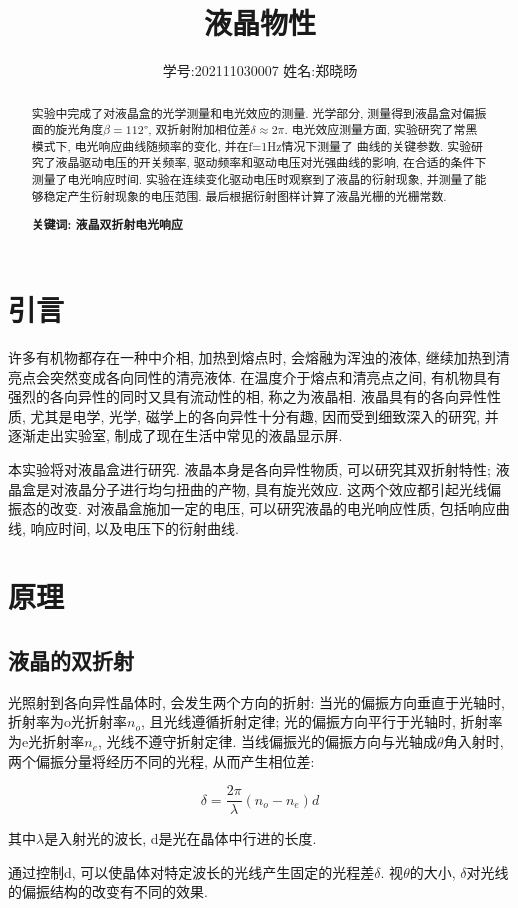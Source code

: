 \documentclass[12pt,a4paper]{article}
\title{\vspace{-4cm}\Large 液晶物性}  %
\author{\kaishu 学号:202111030007 \hspace{2cm} 姓名:郑晓旸}   %
\date{}
\newcommand{\be}[1]{
    \begin{equation}
        #1
    \end{equation}
}
\begin{document}
\maketitle

\begin{abstract}
    实验中完成了对液晶盒的光学测量和电光效应的测量. 光学部分, 测量得到液晶盒对偏振面的旋光角度$\beta=112°$, 双折射附加相位差$\delta \approx 2\pi$. 电光效应测量方面, 实验研究了常黑模式下, 电光响应曲线随频率的变化, 并在f=1Hz情况下测量了
曲线的关键参数. 实验研究了液晶驱动电压的开关频率, 驱动频率和驱动电压对光强曲线的影响, 在合适的条件下测量了电光响应时间. 实验在连续变化驱动电压时观察到了液晶的衍射现象, 并测量了能够稳定产生衍射现象的电压范围. 最后根据衍射图样计算了液晶光栅的光栅常数. 

\textbf{关键词: 液晶\quad 双折射\quad 电光响应}
\end{abstract}

\section{引言}
许多有机物都存在一种中介相, 加热到熔点时, 会熔融为浑浊的液体, 继续加热到清亮点会突然变成各向同性的清亮液体. 
在温度介于熔点和清亮点之间, 有机物具有强烈的各向异性的同时又具有流动性的相, 称之为液晶相. 液晶具有的各向异性性质, 尤其是电学, 光学, 磁学上的各向异性十分有趣, 因而受到细致深入的研究, 并逐渐走出实验室, 制成了现在生活中常见的液晶显示屏. 

本实验将对液晶盒进行研究. 液晶本身是各向异性物质, 可以研究其双折射特性; 液晶盒是对液晶分子进行均匀扭曲的产物, 具有旋光效应. 这两个效应都引起光线偏振态的改变. 
对液晶盒施加一定的电压, 可以研究液晶的电光响应性质, 包括响应曲线, 响应时间, 以及电压下的衍射曲线.
\section{原理}
\subsection{液晶的双折射}
光照射到各向异性晶体时, 会发生两个方向的折射: 当光的偏振方向垂直于光轴时, 折射率为o光折射率$n_{o}$, 且光线遵循折射定律; 光的偏振方向平行于光轴时, 折射率为e光折射率$n_{e}$, 光线不遵守折射定律. 当线偏振光的偏振方向与光轴成$\theta$角入射时, 两个偏振分量将经历不同的光程, 从而产生相位差: 
\be{\delta=\frac{2\pi}{\lambda}(n_{o}-n_{e})d}
其中$\lambda$是入射光的波长, d是光在晶体中行进的长度. 

通过控制d, 可以使晶体对特定波长的光线产生固定的光程差$\delta$. 视$\theta$的大小, $\delta$对光线的偏振结构的改变有不同的效果. 
\end{document}

